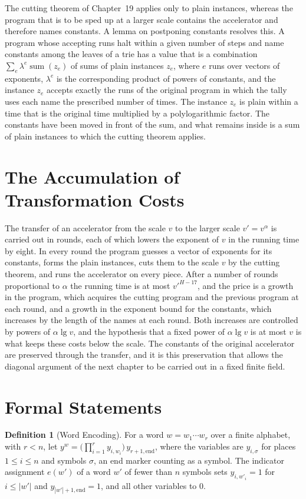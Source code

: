 \documentclass[11pt,letterpaper]{report}
\theoremstyle{plain}
\theoremstyle{definition}
\newtheorem{definition}[theorem]{Definition}
\theoremstyle{remark}
\begin{document}
The cutting theorem of Chapter~19 applies only to plain instances, whereas the program that is to be sped up at a larger scale contains the accelerator and therefore names constants. A lemma on postponing constants resolves this. A program whose accepting runs halt within a given number of steps and name constants among the leaves of a trie has a value that is a combination $\sum_e\lambda^e\operatorname{sum}(z_e)$ of sums of plain instances $z_e$, where $e$ runs over vectors of exponents, $\lambda^e$ is the corresponding product of powers of constants, and the instance $z_e$ accepts exactly the runs of the original program in which the tally uses each name the prescribed number of times. The instance $z_e$ is plain within a time that is the original time multiplied by a polylogarithmic factor. The constants have been moved in front of the sum, and what remains inside is a sum of plain instances to which the cutting theorem applies.

\section{The Accumulation of Transformation Costs}

The transfer of an accelerator from the scale $v$ to the larger scale $v'=v^{\alpha}$ is carried out in rounds, each of which lowers the exponent of $v$ in the running time by eight. In every round the program guesses a vector of exponents for its constants, forms the plain instances, cuts them to the scale $v$ by the cutting theorem, and runs the accelerator on every piece. After a number of rounds proportional to $\alpha$ the running time is at most $v'^{H-17}$, and the price is a growth in the program, which acquires the cutting program and the previous program at each round, and a growth in the exponent bound for the constants, which increases by the length of the names at each round. Both increases are controlled by powers of $\alpha\lg v$, and the hypothesis that a fixed power of $\alpha\lg v$ is at most $v$ is what keeps these costs below the scale. The constants of the original accelerator are preserved through the transfer, and it is this preservation that allows the diagonal argument of the next chapter to be carried out in a fixed finite field.

\section{Formal Statements}

\begin{definition}[Word Encoding]
For a word $w=w_1\cdots w_r$ over a finite alphabet, with $r<n$, let $y^w=\bigl(\prod_{i=1}^{r}y_{i,w_i}\bigr)\,y_{r+1,\mathrm{end}}$, where the variables are $y_{i,\sigma}$ for places $1\le i\le n$ and symbols $\sigma$, an end marker counting as a symbol. The indicator assignment $e(w')$ of a word $w'$ of fewer than $n$ symbols sets $y_{i,w'_i}=1$ for $i\le|w'|$ and $y_{|w'|+1,\mathrm{end}}=1$, and all other variables to $0$.
\end{definition}
\end{document}
